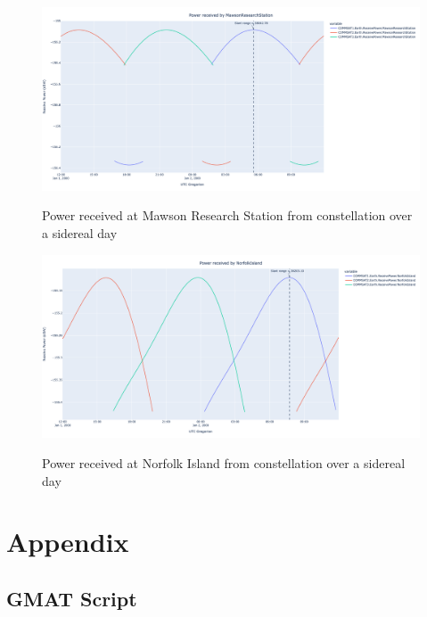 \documentclass[12pt]{article}
\begin{document}
\begin{figure}[H]
    \centering
    \includegraphics[width=\linewidth]{figures/MawsonReceivePower.png}\\
    \caption{Power received at Mawson Research Station from constellation over a sidereal day}
    \label{fig:mawson_power}
\end{figure}
\begin{figure}[H]
    \centering
    \includegraphics[width=\linewidth]{figures/NorfolkReceivePower.png}\\
    \caption{Power received at Norfolk Island from constellation over a sidereal day}
    \label{fig:norfolk_power}
\end{figure}

\newpage
\section{Appendix}

\subsection{GMAT Script}

\end{document}
